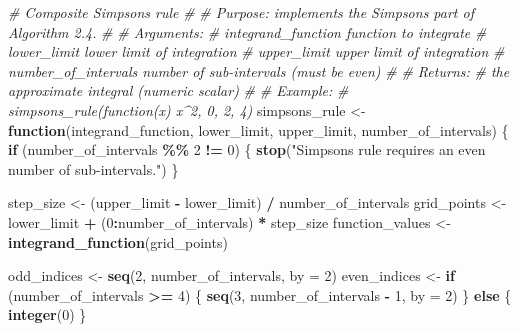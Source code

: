 \documentclass[
]{article}
\newenvironment{Shaded}{\begin{snugshade}}{\end{snugshade}}
\newcommand{\AttributeTok}[1]{\textcolor[rgb]{0.13,0.29,0.53}{#1}}
\newcommand{\CommentTok}[1]{\textcolor[rgb]{0.56,0.35,0.01}{\textit{#1}}}
\newcommand{\ControlFlowTok}[1]{\textcolor[rgb]{0.13,0.29,0.53}{\textbf{#1}}}
\newcommand{\DecValTok}[1]{\textcolor[rgb]{0.00,0.00,0.81}{#1}}
\newcommand{\FunctionTok}[1]{\textcolor[rgb]{0.13,0.29,0.53}{\textbf{#1}}}
\newcommand{\NormalTok}[1]{#1}
\newcommand{\OtherTok}[1]{\textcolor[rgb]{0.56,0.35,0.01}{#1}}
\newcommand{\SpecialCharTok}[1]{\textcolor[rgb]{0.81,0.36,0.00}{\textbf{#1}}}
\newcommand{\StringTok}[1]{\textcolor[rgb]{0.31,0.60,0.02}{#1}}
\begin{document}
\begin{Shaded}
\begin{Highlighting}[]
\CommentTok{\#\textquotesingle{} Composite Simpson\textquotesingle{}s rule}
\CommentTok{\#\textquotesingle{}}
\CommentTok{\#\textquotesingle{} Purpose: implements the Simpson\textquotesingle{}s part of Algorithm 2.4.}
\CommentTok{\#\textquotesingle{}}
\CommentTok{\#\textquotesingle{} Arguments:}
\CommentTok{\#\textquotesingle{}   integrand\_function   function to integrate}
\CommentTok{\#\textquotesingle{}   lower\_limit          lower limit of integration}
\CommentTok{\#\textquotesingle{}   upper\_limit          upper limit of integration}
\CommentTok{\#\textquotesingle{}   number\_of\_intervals  number of sub{-}intervals (must be even)}
\CommentTok{\#\textquotesingle{}}
\CommentTok{\#\textquotesingle{} Returns:}
\CommentTok{\#\textquotesingle{}   the approximate integral (numeric scalar)}
\CommentTok{\#\textquotesingle{}}
\CommentTok{\#\textquotesingle{} Example:}
\CommentTok{\#\textquotesingle{}   simpsons\_rule(function(x) x\^{}2, 0, 2, 4)}
\NormalTok{simpsons\_rule }\OtherTok{\textless{}{-}} \ControlFlowTok{function}\NormalTok{(integrand\_function, lower\_limit, upper\_limit, number\_of\_intervals) \{}
  \ControlFlowTok{if}\NormalTok{ (number\_of\_intervals }\SpecialCharTok{\%\%} \DecValTok{2} \SpecialCharTok{!=} \DecValTok{0}\NormalTok{) \{}
    \FunctionTok{stop}\NormalTok{(}\StringTok{"Simpson\textquotesingle{}s rule requires an even number of sub{-}intervals."}\NormalTok{)}
\NormalTok{  \}}

\NormalTok{  step\_size }\OtherTok{\textless{}{-}}\NormalTok{ (upper\_limit }\SpecialCharTok{{-}}\NormalTok{ lower\_limit) }\SpecialCharTok{/}\NormalTok{ number\_of\_intervals}
\NormalTok{  grid\_points }\OtherTok{\textless{}{-}}\NormalTok{ lower\_limit }\SpecialCharTok{+}\NormalTok{ (}\DecValTok{0}\SpecialCharTok{:}\NormalTok{number\_of\_intervals) }\SpecialCharTok{*}\NormalTok{ step\_size}
\NormalTok{  function\_values }\OtherTok{\textless{}{-}} \FunctionTok{integrand\_function}\NormalTok{(grid\_points)}

\NormalTok{  odd\_indices }\OtherTok{\textless{}{-}} \FunctionTok{seq}\NormalTok{(}\DecValTok{2}\NormalTok{, number\_of\_intervals, }\AttributeTok{by =} \DecValTok{2}\NormalTok{)}
\NormalTok{  even\_indices }\OtherTok{\textless{}{-}} \ControlFlowTok{if}\NormalTok{ (number\_of\_intervals }\SpecialCharTok{\textgreater{}=} \DecValTok{4}\NormalTok{) \{}
    \FunctionTok{seq}\NormalTok{(}\DecValTok{3}\NormalTok{, number\_of\_intervals }\SpecialCharTok{{-}} \DecValTok{1}\NormalTok{, }\AttributeTok{by =} \DecValTok{2}\NormalTok{)}
\NormalTok{  \} }\ControlFlowTok{else}\NormalTok{ \{}
    \FunctionTok{integer}\NormalTok{(}\DecValTok{0}\NormalTok{)}
\NormalTok{  \}}


\end{Highlighting}
\end{Shaded}
\end{document}
